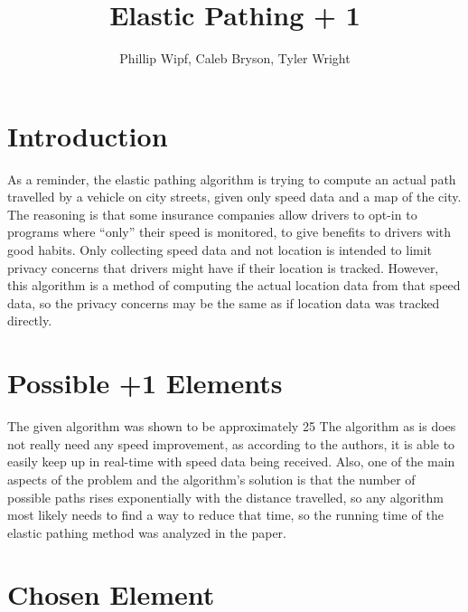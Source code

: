 \documentclass[11pt]{article}
\title{Elastic Pathing + 1}
\author{Phillip Wipf, Caleb Bryson, Tyler Wright}
\begin{document}
\maketitle
\section{Introduction}

As a reminder, the elastic pathing algorithm is trying to compute an actual path travelled by a vehicle on city streets, given only speed data and a map of the city.  The reasoning is that some insurance companies allow drivers to opt-in to programs where “only” their speed is monitored, to give benefits to drivers with good habits.  Only collecting speed data and not location is intended to limit privacy concerns that drivers might have if their location is tracked.  However, this algorithm is a method of computing the actual location data from that speed data, so the privacy concerns may be the same as if location data was tracked directly.

\section{Possible +1 Elements}

The given algorithm was shown to be approximately 25%
\newline
The algorithm as is does not really need any speed improvement, as according to the authors, it is able to easily keep up in real-time with speed data being received.  Also, one of the main aspects of the problem and the algorithm’s solution is that the number of possible paths rises exponentially with the distance travelled, so any algorithm most likely needs to find a way to reduce that time, so the running time of the elastic pathing method was analyzed in the paper.

\section{Chosen Element}
\end{document}
